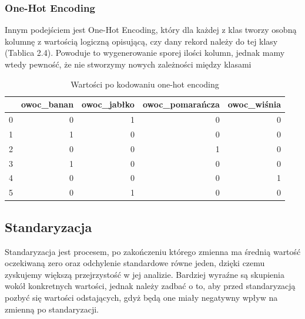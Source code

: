 \documentclass[oneside]{book}
\begin{document}
\subsubsection*{One-Hot Encoding}
Innym podejściem jest One-Hot Encoding\cite{one_hot_encoding}, który dla każdej z klas 
tworzy osobną kolumnę z wartością logiczną opisującą, czy dany 
rekord należy do tej klasy (Tablica 2.4). Powoduje to wygenerowanie sporej 
ilości kolumn, jednak mamy wtedy pewność, że nie stworzymy 
nowych zależności między klasami

\begin{table}[H]
    \begin{center}
    \begin{tabular}{|r|r|r|r|r|}
    \hline
    \textbf{} & \textbf{owoc\_banan} & \textbf{owoc\_jabłko} & \textbf{owoc\_pomarańcza} & \textbf{owoc\_wiśnia} \\ \hline
    0         & 0                    & 1                     & 0                         & 0                     \\ \hline
    1         & 1                    & 0                     & 0                         & 0                     \\ \hline
    2         & 0                    & 0                     & 1                         & 0                     \\ \hline
    3         & 1                    & 0                     & 0                         & 0                     \\ \hline
    4         & 0                    & 0                     & 0                         & 1                     \\ \hline
    5         & 0                    & 1                     & 0                         & 0                     \\ \hline
    \end{tabular}
    \caption{Wartości po kodowaniu one-hot encoding }
    \end{center}
    \end{table}

\subsection*{Standaryzacja}
Standaryzacja jest procesem, po zakończeniu którego zmienna 
ma średnią wartość oczekiwaną zero oraz odchylenie standardowe 
równe jeden, dzięki czemu zyskujemy większą przejrzystość w 
jej analizie. Bardziej wyraźne są skupienia wokół konkretnych 
wartości, jednak należy zadbać o to, aby przed standaryzacją 
pozbyć się wartości odstających, gdyż będą one miały negatywny 
wpływ na zmienną po standaryzacji.
\end{document}

